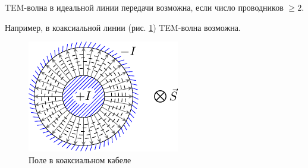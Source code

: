 \documentclass[a4paper,14pt]{extarticle}
\begin{document}
%
%
%

 TEM-волна в идеальной линии передачи возможна, если число проводников $\geq 2$.

Например, в коаксиальной линии (рис. \ref{fig:lect4:6}) TEM-волна возможна.

\begin{figure}[h!]
	\centering
	\includegraphics[scale=1.5]{img/lect4_ris6}
	\caption{Поле в коаксиальном кабеле}
	\label{fig:lect4:6}
\end{figure}

\end{document}
